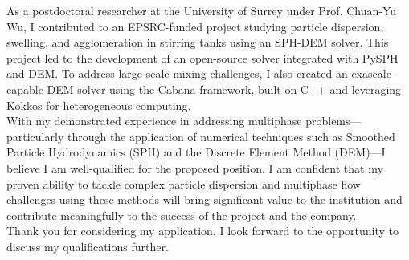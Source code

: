 \documentclass[11pt,a4paper,roman]{moderncv}
\begin{document}
\vspace{1em}
As a postdoctoral researcher at the University of Surrey under Prof. Chuan-Yu Wu, I
contributed to an EPSRC-funded project studying particle dispersion,
swelling, and agglomeration in stirring tanks using an SPH-DEM
solver. This project led to the development of an open-source solver
integrated with PySPH and DEM. To address large-scale mixing
challenges, I also created an exascale-capable DEM solver using the
Cabana framework, built on C++ and leveraging Kokkos for heterogeneous
computing.\\


\vspace{1em}
With my demonstrated experience in addressing multiphase
problems—particularly through the application of numerical techniques
such as Smoothed Particle Hydrodynamics (SPH) and the Discrete Element
Method (DEM)—I believe I am well-qualified for the proposed
position. I am confident that my proven ability to tackle complex
particle dispersion and multiphase flow challenges using these methods
will bring significant value to the institution and contribute
meaningfully to the success of the project and the company.\\



\vspace{1em}
Thank you for considering my application. I look forward to the
opportunity to discuss my qualifications further.\\



\vspace{0.5cm}


\makeletterclosing
\end{document}
